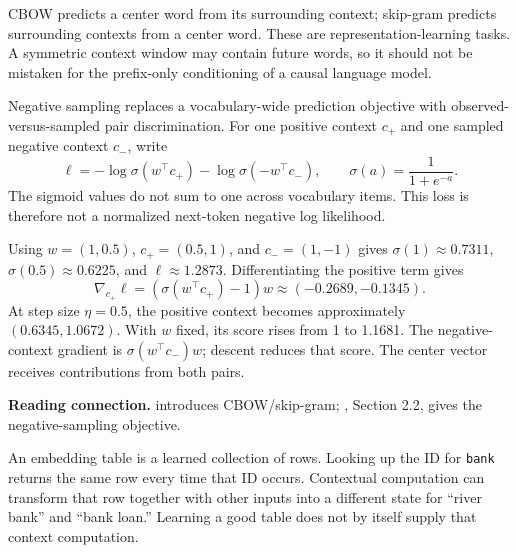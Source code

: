 
CBOW predicts a center word from its surrounding context; skip-gram predicts
surrounding contexts from a center word. These are representation-learning
tasks. A symmetric context window may contain future words, so it should
not be mistaken for the prefix-only conditioning of a causal language model.


Negative sampling replaces a vocabulary-wide prediction objective with
observed-versus-sampled pair discrimination. For one positive context $c_+$
and one sampled negative context $c_-$, write
\[
 \ell=-\log\sigma(w^\top c_+)-\log\sigma(-w^\top c_-),\qquad
 \sigma(a)=\frac1{1+e^{-a}}.
\]
The sigmoid values do not sum to one across vocabulary items. This loss
is therefore not a normalized next-token negative log likelihood.


Using $w=(1,0.5)$, $c_+=(0.5,1)$, and $c_-=(1,-1)$ gives
$\sigma(1)\approx0.7311$, $\sigma(0.5)\approx0.6225$, and
$\ell\approx1.2873$. Differentiating the positive term gives
\[
 \nabla_{c_+}\ell=(\sigma(w^\top c_+)-1)w
 \approx(-0.2689,-0.1345).
\]
At step size $\eta=0.5$, the positive context becomes approximately
$(0.6345,1.0672)$. With $w$ fixed, its score rises from 1 to 1.1681.
The negative-context gradient is $\sigma(w^\top c_-)w$; descent reduces
that score. The center vector receives contributions from both pairs.

\textbf{Reading connection.}  introduces CBOW/skip-gram;
, Section 2.2, gives the negative-sampling objective.

An embedding table is a learned collection of rows. Looking up the ID for
\texttt{bank} returns the same row every time that ID occurs. Contextual
computation can transform that row together with other inputs into a
different state for ``river bank'' and ``bank loan.'' Learning a good table
does not by itself supply that context computation.

